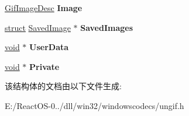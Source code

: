 \begin{DoxyCompactItemize}
\hyperlink{struct_gif_image_desc}{Gif\+Image\+Desc} {\bfseries Image}
\item 
\mbox{\label{struct_gif_file_type_a76241fbc23dd2bbb36a88d76b3085c88}} 
\hyperlink{interfacestruct}{struct} \hyperlink{struct_saved_image}{Saved\+Image} $\ast$ {\bfseries Saved\+Images}
\item 
\mbox{\label{struct_gif_file_type_af0dfe555b00110a85e17e1b5444db460}} 
\hyperlink{interfacevoid}{void} $\ast$ {\bfseries User\+Data}
\item 
\mbox{\label{struct_gif_file_type_a9bcdac03934be4df7d10a114ccc57452}} 
\hyperlink{interfacevoid}{void} $\ast$ {\bfseries Private}
\end{DoxyCompactItemize}


该结构体的文档由以下文件生成\+:\begin{DoxyCompactItemize}
\item 
E\+:/\+React\+O\+S-\/0../dll/win32/windowscodecs/ungif.\+h\end{DoxyCompactItemize}

